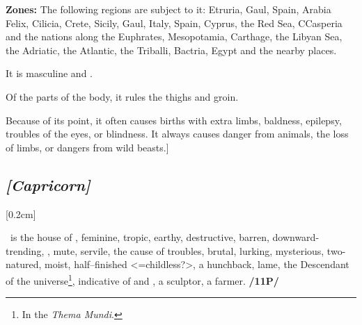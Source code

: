 \textbf{Zones:} The following regions are subject to it: Etruria, Gaul, Spain, Arabia Felix, Cilicia, Crete, Sicily, Gaul, Italy, Spain, Cyprus, the Red Sea, CCasperia and the nations along the Euphrates, Mesopotamia, Carthage, the Libyan Sea, the Adriatic, the Atlantic, the Triballi, Bactria, Egypt and the nearby places. 

It is masculine and . 

Of the parts of the body, it rules the thighs and groin.

Because of its point, it often causes births with extra limbs, baldness, epilepsy, troubles of the eyes, or blindness. It always causes danger from animals, the loss of limbs, or dangers from wild beasts.]

\secbr
\subsection{\textit{[Capricorn]}}
[0.2cm]

 \Capricorn\, is the house of \Saturn,  feminine,  tropic,  earthy, destructive,  barren, downward-trending, ,  mute,  servile, the cause of troubles, brutal, lurking, mysterious, two-natured, moist, half–finished <=childless?>, a hunchback, lame, the Descendant of the universe\footnote{In the \textit{Thema Mundi}.}, indicative of  and , a sculptor, a farmer. \textbf{/11P/ }


